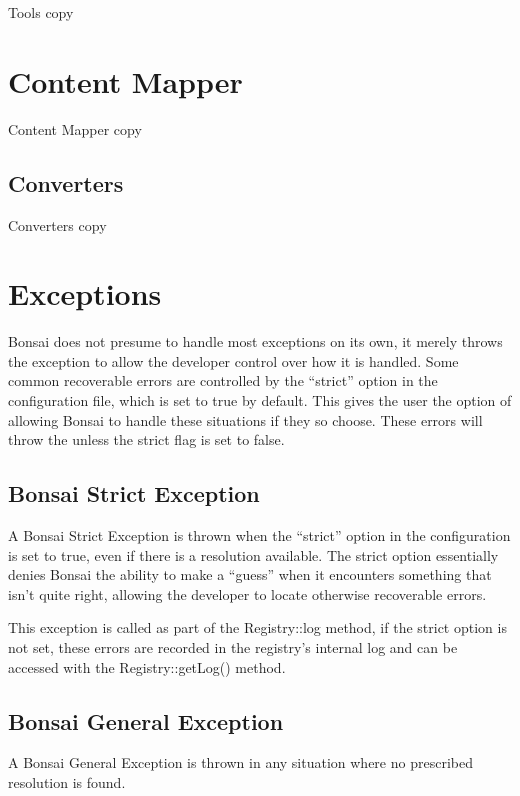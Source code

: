 \documentclass[]{book}
\begin{document}
Tools copy

\section{Content Mapper}

Content Mapper copy

\subsection{Converters}

Converters copy

\section{Exceptions}

Bonsai does not presume to handle most exceptions on its own, it merely throws the exception to allow the developer control over how it is handled. Some common recoverable errors are controlled by the \enquote{strict} option in the configuration file, which is set to true by default. This gives the user the option of allowing Bonsai to handle these situations if they so choose. These errors will throw the  unless the strict flag is set to false.

\subsection{Bonsai Strict Exception}
\label{sec:bonsaiStrictExecption}

A Bonsai Strict Exception is thrown when the \enquote{strict} option in the configuration is set to true, even if there is a resolution available. The strict option essentially denies Bonsai the ability to make a \enquote{guess} when it encounters something that isn't quite right, allowing the developer to locate otherwise recoverable errors.

This exception is called as part of the Registry::log method, if the strict option is not set, these errors are recorded in the registry's internal log and can be accessed with the Registry::getLog() method.

\subsection{Bonsai General Exception}
\label{sec:bonsaiGeneralExecption}

A Bonsai General Exception is thrown in any situation where no prescribed resolution is found.
\end{document}
